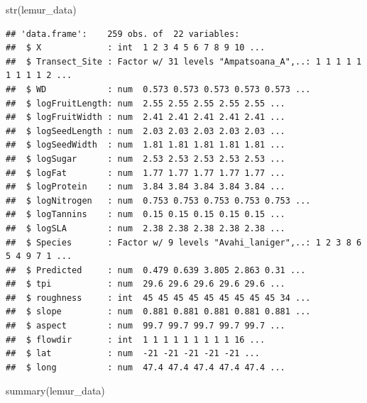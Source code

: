 \documentclass[
  12pt,
]{article}
\newenvironment{Shaded}{\begin{snugshade}}{\end{snugshade}}
\newcommand{\FunctionTok}[1]{\textcolor[rgb]{0.00,0.00,0.00}{#1}}
\newcommand{\NormalTok}[1]{#1}
\begin{document}
\begin{Shaded}
\begin{Highlighting}[]
\FunctionTok{str}\NormalTok{(lemur\_data)}
\end{Highlighting}
\end{Shaded}

\begin{verbatim}
## 'data.frame':    259 obs. of  22 variables:
##  $ X             : int  1 2 3 4 5 6 7 8 9 10 ...
##  $ Transect_Site : Factor w/ 31 levels "Ampatsoana_A",..: 1 1 1 1 1 1 1 1 1 2 ...
##  $ WD            : num  0.573 0.573 0.573 0.573 0.573 ...
##  $ logFruitLength: num  2.55 2.55 2.55 2.55 2.55 ...
##  $ logFruitWidth : num  2.41 2.41 2.41 2.41 2.41 ...
##  $ logSeedLength : num  2.03 2.03 2.03 2.03 2.03 ...
##  $ logSeedWidth  : num  1.81 1.81 1.81 1.81 1.81 ...
##  $ logSugar      : num  2.53 2.53 2.53 2.53 2.53 ...
##  $ logFat        : num  1.77 1.77 1.77 1.77 1.77 ...
##  $ logProtein    : num  3.84 3.84 3.84 3.84 3.84 ...
##  $ logNitrogen   : num  0.753 0.753 0.753 0.753 0.753 ...
##  $ logTannins    : num  0.15 0.15 0.15 0.15 0.15 ...
##  $ logSLA        : num  2.38 2.38 2.38 2.38 2.38 ...
##  $ Species       : Factor w/ 9 levels "Avahi_laniger",..: 1 2 3 8 6 5 4 9 7 1 ...
##  $ Predicted     : num  0.479 0.639 3.805 2.863 0.31 ...
##  $ tpi           : num  29.6 29.6 29.6 29.6 29.6 ...
##  $ roughness     : int  45 45 45 45 45 45 45 45 45 34 ...
##  $ slope         : num  0.881 0.881 0.881 0.881 0.881 ...
##  $ aspect        : num  99.7 99.7 99.7 99.7 99.7 ...
##  $ flowdir       : int  1 1 1 1 1 1 1 1 1 16 ...
##  $ lat           : num  -21 -21 -21 -21 -21 ...
##  $ long          : num  47.4 47.4 47.4 47.4 47.4 ...
\end{verbatim}

\begin{Shaded}
\begin{Highlighting}[]
\FunctionTok{summary}\NormalTok{(lemur\_data)}
\end{Highlighting}
\end{Shaded}
\end{document}
